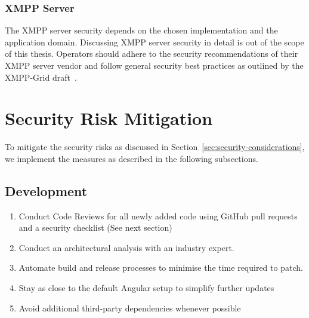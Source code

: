 \subsubsection{XMPP Server}

The XMPP server security depends on the chosen implementation and the application domain.
Discussing XMPP server security in detail is out of the scope of this thesis.
Operators should adhere to the security recommendations of their XMPP server vendor and follow general security best practices as outlined by the XMPP-Grid draft~\cite{ietf-mile-xmpp-grid-05}.

\section{Security Risk Mitigation}

To mitigate the security risks as discussed in Section~\ref{sec:security-considerations}, we implement the measures as described in the following subsections.

\subsection{Development}

\begin{enumerate}
    \item Conduct Code Reviews for all newly added code using GitHub pull requests and a security checklist (See next section)
    \item Conduct an architectural analysis with an industry expert.
    \item Automate build and release processes to minimise the time required to patch.
    \item Stay as close to the default Angular setup to simplify further updates
    \item Avoid additional third-party dependencies whenever possible
\end{enumerate}

